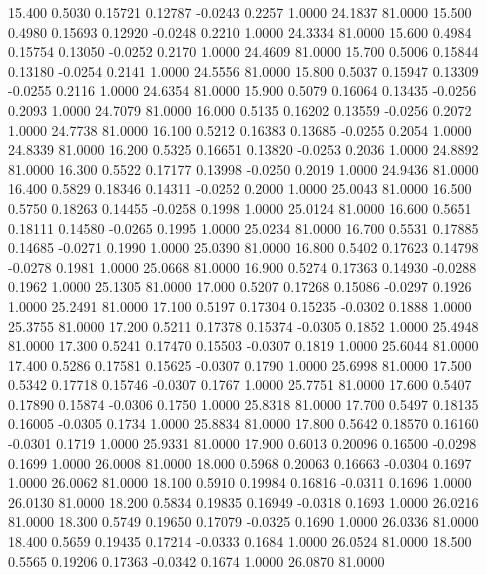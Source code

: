   15.400   0.5030   0.15721   0.12787  -0.0243   0.2257   1.0000  24.1837  81.0000
  15.500   0.4980   0.15693   0.12920  -0.0248   0.2210   1.0000  24.3334  81.0000
  15.600   0.4984   0.15754   0.13050  -0.0252   0.2170   1.0000  24.4609  81.0000
  15.700   0.5006   0.15844   0.13180  -0.0254   0.2141   1.0000  24.5556  81.0000
  15.800   0.5037   0.15947   0.13309  -0.0255   0.2116   1.0000  24.6354  81.0000
  15.900   0.5079   0.16064   0.13435  -0.0256   0.2093   1.0000  24.7079  81.0000
  16.000   0.5135   0.16202   0.13559  -0.0256   0.2072   1.0000  24.7738  81.0000
  16.100   0.5212   0.16383   0.13685  -0.0255   0.2054   1.0000  24.8339  81.0000
  16.200   0.5325   0.16651   0.13820  -0.0253   0.2036   1.0000  24.8892  81.0000
  16.300   0.5522   0.17177   0.13998  -0.0250   0.2019   1.0000  24.9436  81.0000
  16.400   0.5829   0.18346   0.14311  -0.0252   0.2000   1.0000  25.0043  81.0000
  16.500   0.5750   0.18263   0.14455  -0.0258   0.1998   1.0000  25.0124  81.0000
  16.600   0.5651   0.18111   0.14580  -0.0265   0.1995   1.0000  25.0234  81.0000
  16.700   0.5531   0.17885   0.14685  -0.0271   0.1990   1.0000  25.0390  81.0000
  16.800   0.5402   0.17623   0.14798  -0.0278   0.1981   1.0000  25.0668  81.0000
  16.900   0.5274   0.17363   0.14930  -0.0288   0.1962   1.0000  25.1305  81.0000
  17.000   0.5207   0.17268   0.15086  -0.0297   0.1926   1.0000  25.2491  81.0000
  17.100   0.5197   0.17304   0.15235  -0.0302   0.1888   1.0000  25.3755  81.0000
  17.200   0.5211   0.17378   0.15374  -0.0305   0.1852   1.0000  25.4948  81.0000
  17.300   0.5241   0.17470   0.15503  -0.0307   0.1819   1.0000  25.6044  81.0000
  17.400   0.5286   0.17581   0.15625  -0.0307   0.1790   1.0000  25.6998  81.0000
  17.500   0.5342   0.17718   0.15746  -0.0307   0.1767   1.0000  25.7751  81.0000
  17.600   0.5407   0.17890   0.15874  -0.0306   0.1750   1.0000  25.8318  81.0000
  17.700   0.5497   0.18135   0.16005  -0.0305   0.1734   1.0000  25.8834  81.0000
  17.800   0.5642   0.18570   0.16160  -0.0301   0.1719   1.0000  25.9331  81.0000
  17.900   0.6013   0.20096   0.16500  -0.0298   0.1699   1.0000  26.0008  81.0000
  18.000   0.5968   0.20063   0.16663  -0.0304   0.1697   1.0000  26.0062  81.0000
  18.100   0.5910   0.19984   0.16816  -0.0311   0.1696   1.0000  26.0130  81.0000
  18.200   0.5834   0.19835   0.16949  -0.0318   0.1693   1.0000  26.0216  81.0000
  18.300   0.5749   0.19650   0.17079  -0.0325   0.1690   1.0000  26.0336  81.0000
  18.400   0.5659   0.19435   0.17214  -0.0333   0.1684   1.0000  26.0524  81.0000
  18.500   0.5565   0.19206   0.17363  -0.0342   0.1674   1.0000  26.0870  81.0000
